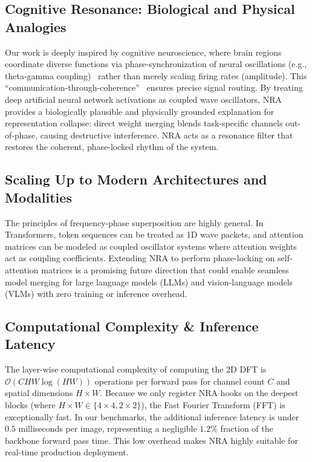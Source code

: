 \documentclass{article}
\theoremstyle{plain}
\theoremstyle{definition}
\theoremstyle{remark}
\begin{document}
\subsection{Cognitive Resonance: Biological and Physical Analogies}
Our work is deeply inspired by cognitive neuroscience, where brain regions coordinate diverse functions via phase-synchronization of neural oscillations (e.g., theta-gamma coupling)~\cite{varela2001brainweb, canolty2006high} rather than merely scaling firing rates (amplitude). This ``communication-through-coherence''~\cite{fries2005mechanism} ensures precise signal routing. By treating deep artificial neural network activations as coupled wave oscillators, NRA provides a biologically plausible and physically grounded explanation for representation collapse: direct weight merging blends task-specific channels out-of-phase, causing destructive interference. NRA acts as a resonance filter that restores the coherent, phase-locked rhythm of the system.

\subsection{Scaling Up to Modern Architectures and Modalities}
The principles of frequency-phase superposition are highly general. In Transformers, token sequences can be treated as 1D wave packets, and attention matrices can be modeled as coupled oscillator systems where attention weights act as coupling coefficients. Extending NRA to perform phase-locking on self-attention matrices is a promising future direction that could enable seamless model merging for large language models (LLMs) and vision-language models (VLMs) with zero training or inference overhead.

\subsection{Computational Complexity \& Inference Latency}
The layer-wise computational complexity of computing the 2D DFT is $\mathcal{O}(C HW \log(HW))$ operations per forward pass for channel count $C$ and spatial dimensions $H \times W$. Because we only register NRA hooks on the deepest blocks (where $H \times W \in \{4 \times 4, 2 \times 2\}$), the Fast Fourier Transform (FFT) is exceptionally fast. In our benchmarks, the additional inference latency is under $0.5$ milliseconds per image, representing a negligible $1.2\%$ fraction of the backbone forward pass time. This low overhead makes NRA highly suitable for real-time production deployment.
\end{document}

